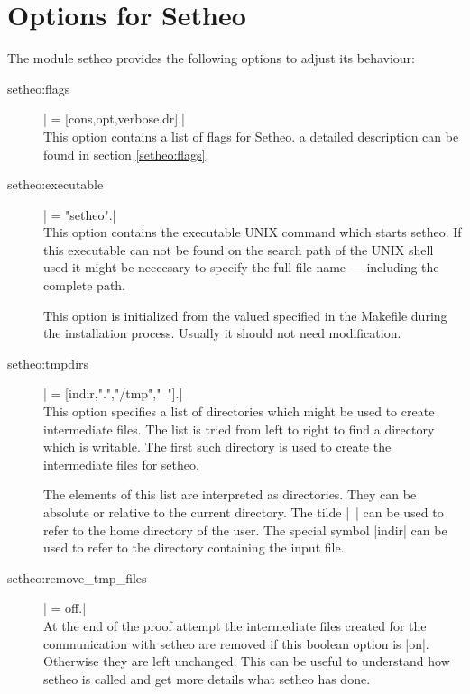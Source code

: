 \section{Options for Setheo}

The module setheo provides the following options to adjust its behaviour:

\begin{description}
  \item [setheo:flags] | = [cons,opt,verbose,dr].|
    \\
    This option contains a list of flags for Setheo. a detailed description can
    be found in section \ref{setheo:flags}.

  \item [setheo:executable] | = "setheo".|
    \\
    This option contains the executable UNIX command which starts setheo. If
    this executable can not be found on the search path of the UNIX shell used
    it might be neccesary to specify the full file name --- including the
    complete path.

    This option is initialized from the valued specified in the Makefile
    during the installation process. Usually it should not need modification.

  \item [setheo:tmpdirs] | = [indir,".","/tmp","~"].|
    \\
    This option specifies a list of directories which might be used to create
    intermediate files. The list is tried from left to right to find a
    directory which is writable. The first such directory is used to create
    the intermediate files for setheo.

    The elements of this list are interpreted as directories. They can be
    absolute or relative to the current directory. The tilde |~| can be used
    to refer to the home directory of the user. The special symbol |indir| can
    be used to refer to the directory containing the input file.

  \item [setheo:remove\_tmp\_files] | = off.|
    \\
    At the end of the proof attempt the intermediate files created for the
    communication with setheo are removed if this boolean option is |on|.
    Otherwise they are left unchanged. This can be useful to understand how
    setheo is called and get more details what setheo has done.

\end{description}



